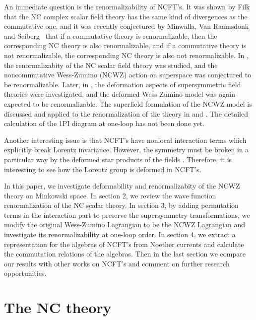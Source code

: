\documentclass[a4paper,a4paper]{article}
\begin{document}
An immediate question is the renormalizability of NCFT's. 
It was shown by Filk~\cite{Filk} that the NC complex scalar field theory 
has the same kind of divergences as the commutative one, 
and it was recently conjectured by Minwalla, 
Van Raamsdonk and Seiberg~\cite{MRS} that if a commutative theory is renormalizable, 
then the corresponding NC theory is also renormalizable, and if a commutative 
theory is not renormalizable, the corresponding NC theory is also not 
renormalizable. 
In \cite{CR}, the renormalizabity of the NC scalar field theory was studied, 
and the noncommutative Wess-Zumino (NCWZ) action on superspace was conjectured to be 
renormalizable. Later, in \cite{FL}, the deformation aspects of supersymmetric 
field theories were investigated, and the deformed Wess-Zumino model 
was again expected to be 
renormalizable. The superfield formulation of the NCWZ model is discussed and applied to 
the renormalization of the theory 
in \cite{CF} and \cite{AJH}. The detailed calculation of the 1PI diagram at one-loop 
has not been done yet. 

Another interesting issue is that NCFT's have nonlocal
interaction terms which explicitly break Lorentz invariance. However, the symmetry
must be broken in a particular way by the deformed star products of the fields
. Therefore, it is interesting to see how the Lorentz group is deformed in NCFT's.


In this paper, we investigate deformability and renormalizabity of the NCWZ theory 
on Minkowski space. In section 2, we review the wave function 
renormalization of the NC scalar \coordHE{} theory. In section 3, 
by adding permutation terms in the interaction part to preserve the 
supersymmetry transformations, we modify the original Wess-Zumino Lagrangian to be the NCWZ 
Lagrangian and investigate its renormalizability at one-loop order.
In section 4, we extract a representation for the algebras of NCFT's from  
Noether currents and calculate the commutation relations of the algebras.  
Then in the last section we compare our results with other works on  
NCFT's and comment on further research opportunities.

\section{The NC \coordHE{} theory}
\end{document}
